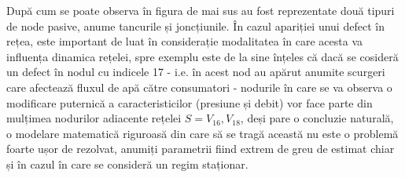 După cum se poate observa în figura de mai sus au fost reprezentate două tipuri de node pasive, anume tancurile și joncțiunile. În cazul apariției unui defect în rețea, este important de luat în considerație modalitatea în care acesta va influența dinamica rețelei, spre exemplu este de la sine înțeles că dacă se cosideră un defect în nodul cu indicele 17 - i.e. în acest nod au apărut anumite scurgeri care afectează fluxul de apă către consumatori - nodurile în care se va observa o modificare puternică a caracteristicilor (presiune și debit) vor face parte din mulțimea nodurilor adiacente rețelei $S={V_{16}, V_{18}}$, deși pare o concluzie naturală, o modelare matematică riguroasă din care să se tragă această nu este o problemă foarte ușor de rezolvat, anumiți parametrii fiind extrem de greu de estimat chiar și în cazul în care se consideră un regim staționar.
